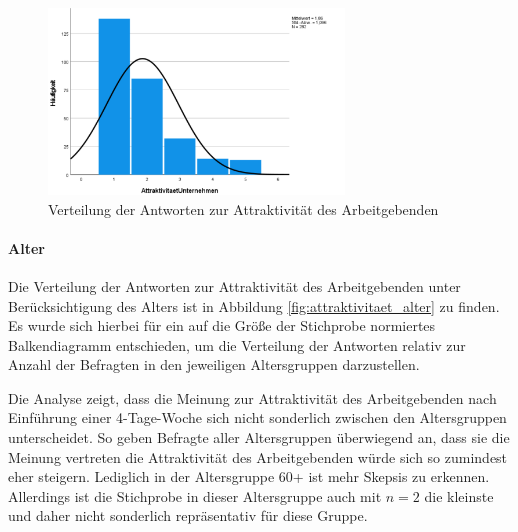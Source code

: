\begin{figure}[h]
    \centering
    \includegraphics[width=0.7\textwidth]{04_Artefakte/01_Abbildungen/hypothese_5/attraktivitaet_histogram.png}
    \caption{Verteilung der Antworten zur Attraktivität des Arbeitgebenden}
    \label{fig:attraktivitaet_verteilung}
\end{figure}

\paragraph*{Alter}


Die Verteilung der Antworten zur Attraktivität des Arbeitgebenden unter Berücksichtigung des Alters ist in Abbildung \ref{fig:attraktivitaet_alter}
zu finden. Es wurde sich hierbei für ein auf die Größe der Stichprobe normiertes Balkendiagramm entschieden, um die Verteilung der Antworten
relativ zur Anzahl der Befragten in den jeweiligen Altersgruppen darzustellen.

Die Analyse zeigt, dass die Meinung zur Attraktivität des Arbeitgebenden nach Einführung einer 4-Tage-Woche sich nicht sonderlich zwischen den
Altersgruppen unterscheidet. So geben Befragte aller Altersgruppen überwiegend an, dass sie die Meinung vertreten die Attraktivität des Arbeitgebenden würde sich
so zumindest eher steigern. Lediglich in der Altersgruppe 60+ ist mehr Skepsis zu erkennen. Allerdings ist die Stichprobe in dieser Altersgruppe
auch mit $n=2$ die kleinste und daher nicht sonderlich repräsentativ für diese Gruppe.


